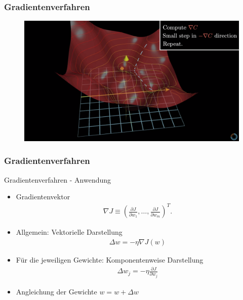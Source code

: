 \begin{frame}
\frametitle{Gradientenverfahren}
\begin{figure}
\includegraphics[width=\linewidth]{./geschichtliches/adeline/img/3dPlot_2}
\end{figure}
\end{frame}


\begin{frame}
\frametitle{Gradientenverfahren}

\begin{block}{Gradientenverfahren - Anwendung}

\begin{itemize}

\item Gradientenvektor
\begin{align*}
\nabla J \equiv \left(\frac{\partial J}{\partial w_1}, \ldots, \frac{\partial J}{\partial w_m}\right)^T.
\end{align*}

\item Allgemein: Vektorielle Darstellung
\begin{align*}
\Delta w = - \eta \nabla J(w)
\end{align*}


\item Für die jeweiligen Gewichte: Komponentenweise Darstellung
\begin{align*}
\Delta w_j = - \eta \frac{\partial J}{\partial w_j}
\end{align*}
\end{itemize}
\end{block}


\begin{itemize}
\item Angleichung der Gewichte $w = w + \Delta w$
\end{itemize}

\end{frame}



